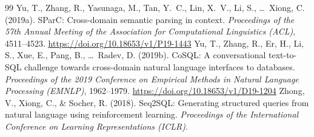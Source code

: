 \documentclass[11pt]{article}
\begin{document}
\begin{thebibliography}{99}
 Yu, T., Zhang, R., Yasunaga, M., Tan, Y.~C., Lin, X.~V., Li, S., \ldots\ Xiong, C. (2019a). SParC: Cross-domain semantic parsing in context. \emph{Proceedings of the 57th Annual Meeting of the Association for Computational Linguistics (ACL)}, 4511--4523. \url{https://doi.org/10.18653/v1/P19-1443}
 Yu, T., Zhang, R., Er, H., Li, S., Xue, E., Pang, B., \ldots\ Radev, D. (2019b). CoSQL: A conversational text-to-SQL challenge towards cross-domain natural language interfaces to databases. \emph{Proceedings of the 2019 Conference on Empirical Methods in Natural Language Processing (EMNLP)}, 1962--1979. \url{https://doi.org/10.18653/v1/D19-1204}
 Zhong, V., Xiong, C., \& Socher, R. (2018). Seq2SQL: Generating structured queries from natural language using reinforcement learning. \emph{Proceedings of the International Conference on Learning Representations (ICLR)}.
\end{thebibliography}
\end{document}
